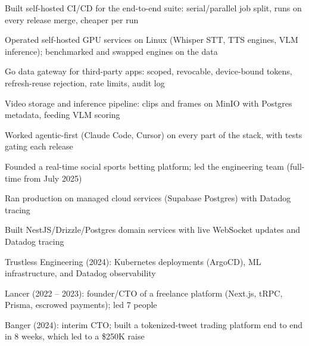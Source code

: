 \documentclass[print]{jack-resume}
\begin{document}
\begin{tightemize}
    \item Built self-hosted CI/CD for the end-to-end suite: serial/parallel job split, runs on every release merge, cheaper per run
    \item Operated self-hosted GPU services on Linux (Whisper STT, TTS engines, VLM inference); benchmarked and swapped engines on the data
    \item Go data gateway for third-party apps: scoped, revocable, device-bound tokens, refresh-reuse rejection, rate limits, audit log
    \item Video storage and inference pipeline: clips and frames on MinIO with Postgres metadata, feeding VLM scoring
    \item Worked agentic-first (Claude Code, Cursor) on every part of the stack, with tests gating each release
\end{tightemize}
\sectionsep

\begin{tightemize}
    \item Founded a real-time social sports betting platform; led the engineering team (full-time from July 2025)
    \item Ran production on managed cloud services (Supabase Postgres) with Datadog tracing
    \item Built NestJS/Drizzle/Postgres domain services with live WebSocket updates and Datadog tracing
\end{tightemize}
\sectionsep

\begin{tightemize}
    \item Trustless Engineering (2024): Kubernetes deployments (ArgoCD), ML infrastructure, and Datadog observability
    \item Lancer (2022 -- 2023): founder/CTO of a freelance platform (Next.js, tRPC, Prisma, escrowed payments); led 7 people
    \item Banger (2024): interim CTO; built a tokenized-tweet trading platform end to end in 8 weeks, which led to a \$250K raise
\end{tightemize}
\sectionsep
\end{document}
